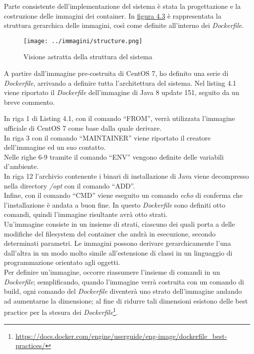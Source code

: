 Parte consistente dell'implementazione del sistema è stata la progettazione e la costruzione delle immagini dei \gls{container}. In \hyperref[fig:images]{figura 4.3} è rappresentata la struttura gerarchica delle immagini, così come definite all'interno dei \textit{Dockerfile}.

\begin{figure}[H]
    \capstart
    \centering
    \texttt{[image: ../immagini/structure.png]}
    \caption{Visione astratta della struttura del sistema}
    \label{fig:images}
\end{figure}

A partire dall'immagine pre-costruita di \gls{CentOS} 7, ho definito una serie di \textit{Dockerfile}, arrivando a definire tutta l'architettura del sistema. Nel listing 4.1 viene riportato il \textit{Dockerfile} dell'immagine di Java 8 update 151, seguito da un breve commento.

  

In riga 1 di Listing 4.1, con il comando ``FROM'', verrà utilizzata l'immagine ufficiale di \gls{CentOS} 7 come base dalla quale derivare. \\
In riga 3 con il comando ``MAINTAINER'' viene riportato il creatore dell'immagine ed un suo contatto. \\
Nelle righe 6-9 tramite il comando ``ENV'' vengono definite delle variabili d'ambiente. \\
In riga 12 l'archivio contenente i binari di installazione di Java viene decompresso nella directory \textit{/opt} con il comando ``ADD''. \\
Infine, con il comando ``CMD'' viene eseguito un comando \textit{echo} di conferma che l'installazione è andata a buon fine. In questo \textit{Dockerfile} sono definiti otto comandi, quindi l'immagine risultante avrà otto strati.\\

Un'\gls{immagine} consiste in un insieme di strati, ciascuno dei quali porta a delle modifiche del filesystem del \gls{container} che andrà in esecuzione, secondo determinati parametri. Le immagini possono derivare gerarchicamente l'una dall'altra in un modo molto simile all'estensione di classi in un linguaggio di programmazione orientato agli oggetti. \\ 

Per definire un'immagine, occorre riassumere l'insieme di comandi in un \textit{Dockerfile}; semplificando, quando l'immagine verrà costruita con un comando di build, ogni comando del \textit{Dockerfile} diventerà uno strato dell'immagine andando ad aumentarne la dimensione; al fine di ridurre tali dimensioni esistono delle best practice per la stesura dei \textit{Dockerfile}\footnote{\url{https://docs.docker.com/engine/userguide/eng-image/dockerfile_best-practices/}}.

